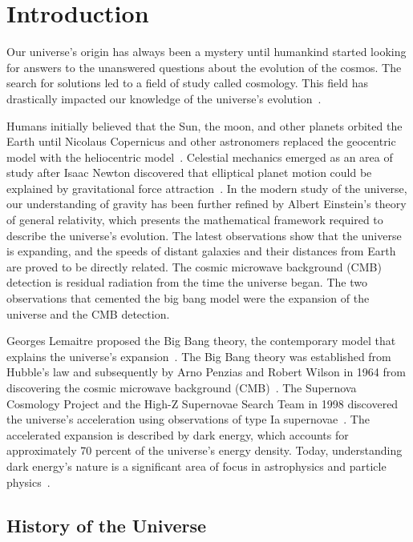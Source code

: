 \chapter{Introduction}

Our universe's origin has always been a mystery until humankind started looking for answers to the unanswered questions about the evolution of the cosmos. The search for solutions led to a field of study called cosmology. This field has drastically impacted our knowledge of the universe's evolution~\citep{book:909085}.

Humans initially believed that the Sun, the moon, and other planets orbited the Earth until Nicolaus Copernicus and other astronomers replaced the geocentric model with the heliocentric model~\citep{sep-copernicus, kanas}.  Celestial mechanics emerged as an area of study after Isaac Newton discovered that elliptical planet motion could be explained by gravitational force attraction~\citep{crowe2013theories,sep-copernicus}. In the modern study of the universe, our understanding of gravity has been further refined by Albert Einstein's theory of general relativity, which presents the mathematical framework required to describe the universe's evolution. The latest observations show that the universe is expanding, and the speeds of distant galaxies and their distances from Earth are proved to be directly related. The cosmic microwave background (CMB) detection is residual radiation from the time the universe began. The two observations that cemented the big bang model were the expansion of the universe and the CMB detection.

Georges Lemaitre proposed the Big Bang theory, the contemporary model that explains the universe's expansion~\citep{1926ApJ....64..321H}. The Big Bang theory was established from Hubble's law and subsequently by Arno Penzias and Robert Wilson in 1964 from discovering the cosmic microwave background (CMB)~\citep{1965ApJ...142..419P, 2003RvMP...75..559P, 1929PNAS...15..168H}. The Supernova Cosmology Project and the High-Z Supernovae Search Team in 1998 discovered the universe's acceleration using observations of type Ia supernovae~\citep{1998AJ....116.1009R, 1999ApJ...517..565P}. The accelerated expansion is described by dark energy, which accounts for approximately 70 percent of the universe's energy density. Today, understanding dark energy's nature is a significant area of focus in astrophysics and particle physics~\citep{2008ARA&A..46..385F}. 

\section{History of the Universe}


